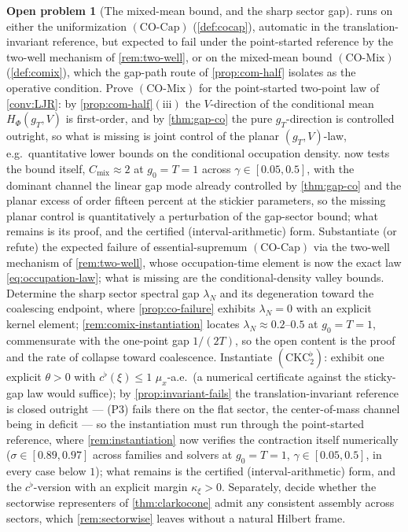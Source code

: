 \documentclass[reqno,final,11pt]{amsart}
\theoremstyle{plain}
\theoremstyle{definition}
\newtheorem{problem}[theorem]{Open problem}
\theoremstyle{remark}
\newcommand{\COcap}{(\mathrm{CO\text{-}Cap})}
\newcommand{\COmix}{(\mathrm{CO\text{-}Mix})}
\begin{document}
\begin{problem}[The mixed-mean bound, and the sharp sector gap]\label{prob:cocap}
 runs on either the uniformization $\COcap$
(\cref{def:cocap}), automatic in the translation-invariant reference, but
expected to fail under the point-started reference by the two-well
mechanism of \cref{rem:two-well}, or on the mixed-mean bound $\COmix$
(\cref{def:comix}), which the gap-path route of \cref{prop:com-half} isolates
as the operative condition. Prove $\COmix$ for the point-started two-point law
of \cref{conv:LJR}: by \cref{prop:com-half}$(\mathrm{iii})$ the
$V$-direction of the conditional mean $H_\Phi(g_T,V)$ is first-order, and by
\cref{thm:gap-co} the pure $g_T$-direction is controlled outright, so
what is missing is joint control of the planar $(g_T,V)$-law, e.g.\ quantitative
lower bounds on the conditional occupation density.
 now tests the bound itself,
$C_{\mathrm{mix}}\approx2$ at $g_0=T=1$ across $\gamma\in[0.05,0.5]$, with the
dominant channel the linear gap mode already controlled by \cref{thm:gap-co}
and the planar excess of order fifteen percent at the stickier parameters, so
the missing planar control is quantitatively a perturbation of the
gap-sector bound; what remains is its proof, and the certified
(interval-arithmetic) form. Substantiate (or refute)
the expected failure of essential-supremum $\COcap$ via the two-well mechanism
of \cref{rem:two-well}, whose occupation-time element is now the exact law
\eqref{eq:occupation-law}; what is missing are the conditional-density valley
bounds. Determine
the sharp sector spectral gap $\lambda_N$ and its degeneration toward the
coalescing endpoint, where \cref{prop:co-failure} exhibits $\lambda_N=0$ with
an explicit kernel element; \cref{rem:comix-instantiation} locates
$\lambda_N\approx0.2$--$0.5$ at $g_0=T=1$, commensurate with the one-point
gap $1/(2T)$, so the open content is the proof and the rate of collapse
toward coalescence. Instantiate $(\mathrm{CKC}_2^{\flat})$: exhibit one
explicit $\theta>0$ with $c^{\flat}(\xi)\le1$ $\mu_x$-a.e.\ (a numerical
certificate against the sticky-gap law would suffice); by
\cref{prop:invariant-fails} the translation-invariant reference is closed
outright --- \textnormal{(P3)} fails there on the flat sector, the
center-of-mass channel being in deficit --- so the instantiation must run
through the point-started reference, where
\cref{rem:instantiation} now verifies the contraction itself numerically
($\sigma\in[0.89,0.97]$ across families and solvers at $g_0=T=1$,
$\gamma\in[0.05,0.5]$, in every case below $1$); what remains
is the certified (interval-arithmetic) form, and the $c^{\flat}$-version
with an explicit margin $\kappa_\xi>0$. Separately, decide whether the sectorwise
representers of \cref{thm:clarkocone} admit any consistent assembly across
sectors, which \cref{rem:sectorwise} leaves without a natural Hilbert frame.
\end{problem}
\end{document}
